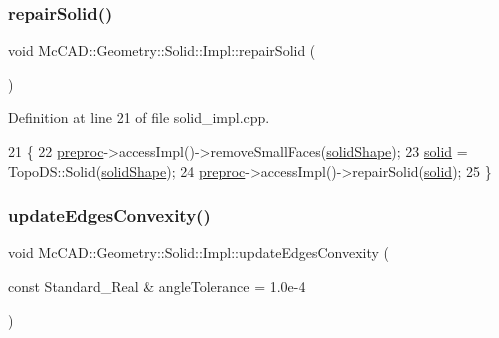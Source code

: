 \subsubsection{\texorpdfstring{repair\+Solid()}{repairSolid()}\hspace{0.1cm}{\footnotesize\ttfamily [2/2]}}
{\footnotesize\ttfamily void Mc\+C\+A\+D\+::\+Geometry\+::\+Solid\+::\+Impl\+::repair\+Solid (\begin{DoxyParamCaption}{ }\end{DoxyParamCaption})}



Definition at line 21 of file solid\+\_\+impl.\+cpp.


\begin{DoxyCode}
21                                    \{
22     \hyperlink{classMcCAD_1_1Geometry_1_1Solid_1_1Impl_ab6393d9ccf9e8046915b6f2b1facfb03}{preproc}->accessImpl()->removeSmallFaces(\hyperlink{classMcCAD_1_1Geometry_1_1Solid_1_1Impl_afcbcbf0a3fa169631d546d96e430f91f}{solidShape});
23     \hyperlink{classMcCAD_1_1Geometry_1_1Solid_1_1Impl_a279f71c11f2a7b285e3093879baf9362}{solid} = TopoDS::Solid(\hyperlink{classMcCAD_1_1Geometry_1_1Solid_1_1Impl_afcbcbf0a3fa169631d546d96e430f91f}{solidShape});
24     \hyperlink{classMcCAD_1_1Geometry_1_1Solid_1_1Impl_ab6393d9ccf9e8046915b6f2b1facfb03}{preproc}->accessImpl()->repairSolid(\hyperlink{classMcCAD_1_1Geometry_1_1Solid_1_1Impl_a279f71c11f2a7b285e3093879baf9362}{solid});
25 \}
\end{DoxyCode}
\mbox{\label{classMcCAD_1_1Geometry_1_1Solid_1_1Impl_a120c6cee4bc3e3d3fb9bd9f12d163c69}} 
\subsubsection{\texorpdfstring{update\+Edges\+Convexity()}{updateEdgesConvexity()}\hspace{0.1cm}{\footnotesize\ttfamily [1/2]}}
{\footnotesize\ttfamily void Mc\+C\+A\+D\+::\+Geometry\+::\+Solid\+::\+Impl\+::update\+Edges\+Convexity (\begin{DoxyParamCaption}\item[{const Standard\+\_\+\+Real \&}]{angle\+Tolerance = {\ttfamily 1.0e-\/4} }\end{DoxyParamCaption})}

